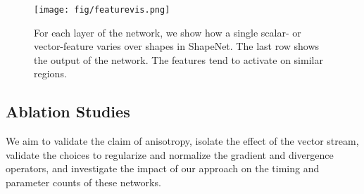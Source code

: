 \documentclass[acmtog, authorversion]{acmart}
\begin{document}
\begin{table}[t]
    \caption{Part segmentation results on ShapeNet.}
    \label{table:part_segmentation}
    \begin{center}
    \end{center}
\end{table}
 
\begin{figure}[t]
    \centering
    \texttt{[image: fig/featurevis.png]}
    \caption{For each layer of the network, we show how a single scalar- or vector-feature varies over shapes in ShapeNet. The last row shows the output of the network. The features tend to activate on similar regions.}
    \label{fig:featurevis}
\end{figure}

\subsection{Ablation Studies}
We aim to validate the claim of anisotropy, isolate the effect of the vector stream, validate the choices to regularize and normalize the gradient and divergence operators, and investigate the impact of our approach on the timing and parameter counts of these networks.
\end{document}
